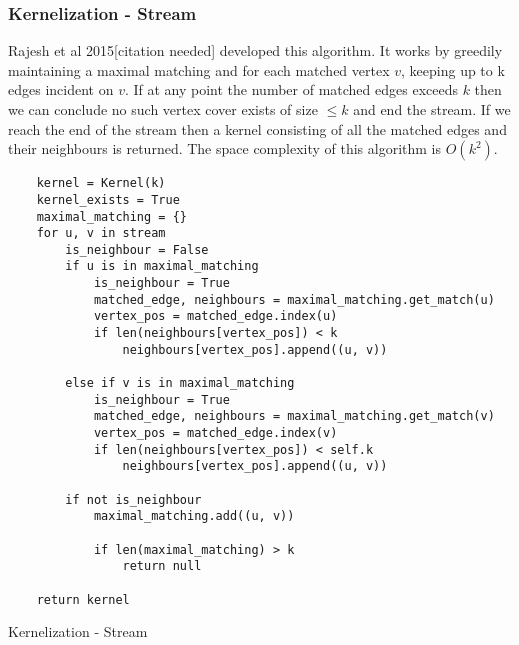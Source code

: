 \subsubsection{Kernelization - Stream}

Rajesh et al 2015{[}citation needed{]} developed this algorithm. It
works by greedily maintaining a maximal matching and for each matched
vertex \(v\), keeping up to k edges incident on \(v\). If at any point
the number of matched edges exceeds \(k\) then we can conclude no such
vertex cover exists of size \(\leq k\) and end the stream. If we reach
the end of the stream then a kernel consisting of all the matched edges
and their neighbours is returned. The space complexity of this algorithm
is \(O(k^2)\).

\begin{verbatim}
    kernel = Kernel(k)
    kernel_exists = True
    maximal_matching = {}
    for u, v in stream
        is_neighbour = False
        if u is in maximal_matching
            is_neighbour = True
            matched_edge, neighbours = maximal_matching.get_match(u)
            vertex_pos = matched_edge.index(u)
            if len(neighbours[vertex_pos]) < k
                neighbours[vertex_pos].append((u, v))

        else if v is in maximal_matching
            is_neighbour = True
            matched_edge, neighbours = maximal_matching.get_match(v)
            vertex_pos = matched_edge.index(v)
            if len(neighbours[vertex_pos]) < self.k
                neighbours[vertex_pos].append((u, v))

        if not is_neighbour
            maximal_matching.add((u, v))

            if len(maximal_matching) > k
                return null

    return kernel
\end{verbatim}

\begin{algorithm}[H]
    \caption{Kernelization - Stream}
    \DontPrintSemicolon

\end{algorithm}

